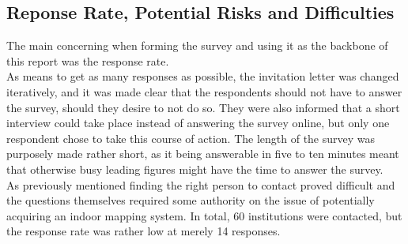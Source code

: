 \subsection{Reponse Rate, Potential Risks and Difficulties}
The main concerning when forming the survey and using it as the backbone of this report was the response rate. 
\newline
\\
As means to get as many responses as possible, the invitation letter was changed iteratively, and it was made clear that the respondents should not have to answer the survey, should they desire to not do so. They were also informed that a short interview could take place instead of answering the survey online, but only one respondent chose to take this course of action. The length of the survey was purposely made rather short, as it being answerable in five to ten minutes meant that otherwise busy leading figures might have the time to answer the survey.
\newline
\\
As previously mentioned finding the right person to contact proved difficult and the questions themselves required some authority on the issue of potentially acquiring an indoor mapping system. In total, 60 institutions were contacted, but the response rate was rather low at merely 14 responses.